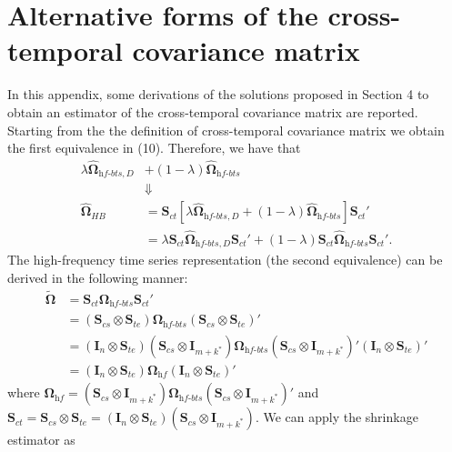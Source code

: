 \documentclass[a4paper,11pt]{article}
\newcommand{\Ivet}{\bm{I}}
\newcommand{\Svet}{\bm{S}}
\newcommand{\Omegavet}{\bm{\Omega}}
\theoremstyle{definition}
\begin{document}
\section{Alternative forms of the cross-temporal covariance matrix}\label{app:shr}
In this appendix, some derivations of the solutions proposed in Section 4 to obtain an estimator of the cross-temporal covariance matrix are reported.
Starting from the the definition of cross-temporal covariance matrix we obtain the first equivalence in (10). Therefore, we have that
\begin{align*}
	\lambda \widehat{\Omegavet}_{\textit{hf-bts}, D} &+ (1-\lambda) \widehat{\Omegavet}_{\textit{hf-bts}}\\
	&\Downarrow\\
	\widehat{\Omegavet}_{HB} & = \Svet_{ct}\left[\lambda \widehat{\Omegavet}_{\textit{hf-bts}, D} + (1-\lambda) \widehat{\Omegavet}_{\textit{hf-bts}}\right]\Svet_{ct}'                                                                        \\
	                         & = \lambda \Svet_{ct}\widehat{\Omegavet}_{\textit{hf-bts}, D}\Svet_{ct}'+ (1-\lambda) \Svet_{ct}\widehat{\Omegavet}_{\textit{hf-bts}}\Svet_{ct}'.
\end{align*}
The high-frequency time series representation (the second equivalence) can be derived in the following manner:
\begin{align*}
	\widetilde{\Omegavet} & = \Svet_{ct}\Omegavet_{\textit{hf-bts}}\Svet_{ct}'                                                                                                                                                            \\
	          & = \left(\Svet_{cs} \otimes \Svet_{te}\right)\Omegavet_{\textit{hf-bts}}\left(\Svet_{cs} \otimes \Svet_{te}\right)'                                                                                            \\
	          & = \left(\Ivet_n \otimes \Svet_{te}\right)\left(\Svet_{cs} \otimes \Ivet_{m+k^\ast}\right)\Omegavet_{\textit{hf-bts}}\left(\Svet_{cs} \otimes \Ivet_{m+k^\ast}\right)'\left(\Ivet_n \otimes \Svet_{te}\right)' \\
	          & = \left(\Ivet_n \otimes \Svet_{te}\right)\Omegavet_{\textit{hf}}\left(\Ivet_n \otimes \Svet_{te}\right)'
\end{align*}
where $\Omegavet_{\textit{hf}} = \left(\Svet_{cs} \otimes \Ivet_{m+k^\ast}\right)\Omegavet_{\textit{hf-bts}}\left(\Svet_{cs} \otimes \Ivet_{m+k^\ast}\right)'$ and $\Svet_{ct} = \Svet_{cs} \otimes \Svet_{te} = \left(\Ivet_n \otimes \Svet_{te}\right)\left(\Svet_{cs} \otimes \Ivet_{m+k^\ast}\right)$. We can apply the shrinkage estimator as
\end{document}
